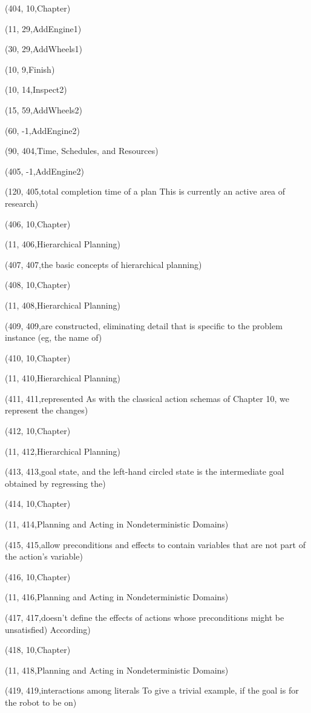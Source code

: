 (404, 10,Chapter)

(11, 29,AddEngine1)

(30, 29,AddWheels1)

(10, 9,Finish)

(10, 14,Inspect2)

(15, 59,AddWheels2)

(60, -1,AddEngine2)

(90, 404,Time, Schedules, and Resources)

(405, -1,AddEngine2)

(120, 405,total completion time of a plan This is currently an active area of research)

(406, 10,Chapter)

(11, 406,Hierarchical Planning)

(407, 407,the basic concepts of hierarchical planning)

(408, 10,Chapter)

(11, 408,Hierarchical Planning)

(409, 409,are constructed, eliminating detail that is speciﬁc to the problem instance (eg, the name of)

(410, 10,Chapter)

(11, 410,Hierarchical Planning)

(411, 411,represented As with the classical action schemas of Chapter 10, we represent the changes)

(412, 10,Chapter)

(11, 412,Hierarchical Planning)

(413, 413,goal state, and the left-hand circled state is the intermediate goal obtained by regressing the)

(414, 10,Chapter)

(11, 414,Planning and Acting in Nondeterministic Domains)

(415, 415,allow preconditions and effects to contain variables that are not part of the action’s variable)

(416, 10,Chapter)

(11, 416,Planning and Acting in Nondeterministic Domains)

(417, 417,doesn’t deﬁne the effects of actions whose preconditions might be unsatisﬁed) According)

(418, 10,Chapter)

(11, 418,Planning and Acting in Nondeterministic Domains)

(419, 419,interactions among literals To give a trivial example, if the goal is for the robot to be on)

